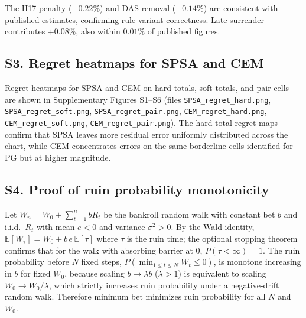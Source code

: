 \documentclass[12pt]{article}
\begin{document}
The H17 penalty ($-0.22\%$) and DAS removal ($-0.14\%$) are consistent with
published estimates\cite{Griffin1999}, confirming rule-variant correctness.  Late
surrender contributes $+0.08\%$, also within $0.01\%$ of published figures.

\subsection*{S3. Regret heatmaps for SPSA and CEM}

Regret heatmaps for SPSA and CEM on hard totals, soft totals, and pair cells are
shown in Supplementary Figures S1--S6 (files
\texttt{SPSA\_regret\_hard.png}, \texttt{SPSA\_regret\_soft.png},
\texttt{SPSA\_regret\_pair.png}, \texttt{CEM\_regret\_hard.png},
\texttt{CEM\_regret\_soft.png}, \texttt{CEM\_regret\_pair.png}).
The hard-total regret maps confirm that SPSA leaves more residual error uniformly
distributed across the chart, while CEM concentrates errors on the same borderline
cells identified for PG but at higher magnitude.

\subsection*{S4. Proof of ruin probability monotonicity}

Let $W_n = W_0 + \sum_{t=1}^n b R_t$ be the bankroll random walk with constant bet
$b$ and i.i.d.\ $R_t$ with mean $e < 0$ and variance $\sigma^2 > 0$.  By the Wald
identity, $\mathbb{E}[W_\tau] = W_0 + b\,e\,\mathbb{E}[\tau]$ where $\tau$ is the
ruin time; the optional stopping theorem confirms that for the walk with absorbing
barrier at 0, $P(\tau < \infty) = 1$.  The ruin probability before $N$ fixed steps,
$P(\min_{1 \le t \le N} W_t \le 0)$, is monotone increasing in $b$ for fixed $W_0$,
because scaling $b \to \lambda b$ ($\lambda > 1$) is equivalent to scaling
$W_0 \to W_0/\lambda$, which strictly increases ruin probability under a
negative-drift random walk.  Therefore minimum bet minimizes ruin probability
for all $N$ and $W_0$.
\end{document}
